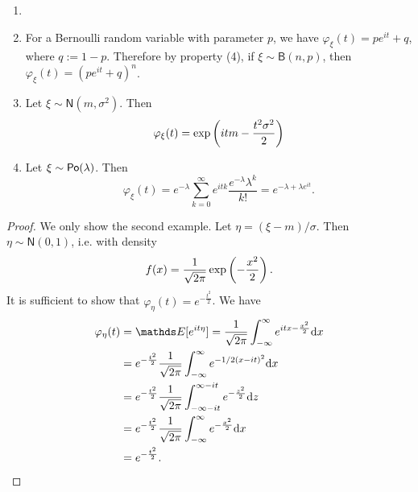 \begin{example}
\begin{enumerate}
    \item[]
    \item For a Bernoulli random variable with parameter $p$, we have $\varphi_\xi (t) = pe^{it} + q$, where $q := 1-p$. Therefore by property (4), if $\xi \sim \mathsf{B}(n,p)$, then $\varphi_\xi (t) = (pe^{it} + q)^n$.
    \item Let $\xi \sim \mathsf{N}(m, \sigma^2)$. Then $$\varphi_\xi(t) = \exp\left( itm - \frac{t^2\sigma^2}{2} \right)$$
    \item Let $\xi \sim \mathsf{Po}(\lambda)$. Then 
    \begin{equation*}
        \varphi_\xi(t) = e^{-\lambda} \sum_{k=0}^\infty e^{i t k} \frac{e^{-\lambda}\lambda^k}{k!} = e^{-\lambda + \lambda e^{it}}.
    \end{equation*}
\end{enumerate}
\end{example}
\begin{proof}
We only show the second example. Let $\eta = (\xi - m)/\sigma$. Then $\eta \sim \mathsf{N}(0,1)$, i.e. with density 
    \begin{equation*}
        f(x) = \frac{1}{\sqrt{2\pi}} \exp\left( -\frac{x^2}{2} \right).
    \end{equation*}
    It is sufficient to show that $\varphi_\eta(t) = e^{-\frac{t^2}{2}}$. We have
    \begin{align*}
        \varphi_\eta (t) &= \E[e^{it\eta}] = \frac{1}{\sqrt{2\pi}} \int_{-\infty}^\infty e^{itx - \frac{x^2}{2}} \d x\\
        &= e ^{-\frac{t^2}{2}} \frac{1}{\sqrt{2\pi}} \int_{-\infty}^\infty e^{-1/2(x-it)^2} \d x\\
        &= e^{-\frac{t^2}{2}} \frac{1}{\sqrt{2\pi}} \int_{-\infty - it}^{\infty -it} e^{-\frac{z^2}{2}} \d z\\
        &= e^{-\frac{t^2}{2}} \frac{1}{\sqrt{2\pi}} \int_{-\infty}^\infty e^{-\frac{x^2}{2}} \d x\\
        &= e ^{-\frac{t^2}{2}}.
\end{align*}
\end{proof}

